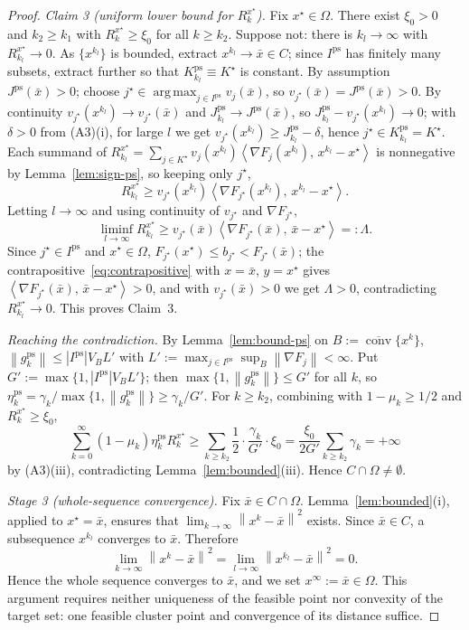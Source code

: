 \documentclass[]{interact}
\theoremstyle{plain}
\theoremstyle{definition}
\theoremstyle{remark}
\newcommand{\norm}[1]{\left\lVert #1 \right\rVert}
\newcommand{\abs}[1]{\left\lvert #1 \right\rvert}
\newcommand{\inner}[2]{\left\langle #1,\, #2 \right\rangle}
\DeclareMathOperator*{\argmax}{arg\,max}
\DeclareMathOperator{\conv}{conv}
\newcommand{\ps}{\mathrm{ps}}
\begin{document}
\begin{proof}
\smallskip
\emph{Claim 3 (uniform lower bound for $R^{x^\star}_k$).} Fix $x^\star\in\Omega$. There
exist $\xi_0>0$ and $k_2\ge k_1$ with $R^{x^\star}_k\ge\xi_0$ for all $k\ge k_2$. Suppose
not: there is $k_l\to\infty$ with $R^{x^\star}_{k_l}\to0$. As $\{x^{k_l}\}$ is bounded,
extract $x^{k_l}\to\bar x\in C$; since $I^{\ps}$ has finitely many subsets, extract
further so that $K^{\ps}_{k_l}\equiv K^\star$ is constant. By assumption
$J^{\ps}(\bar x)>0$; choose $j^\star\in\argmax_{j\in I^{\ps}}v_j(\bar x)$, so
$v_{j^\star}(\bar x)=J^{\ps}(\bar x)>0$. By continuity $v_{j^\star}(x^{k_l})\to
v_{j^\star}(\bar x)$ and $J^{\ps}_{k_l}\to J^{\ps}(\bar x)$, so
$J^{\ps}_{k_l}-v_{j^\star}(x^{k_l})\to0$; with $\delta>0$ from (A3)(i), for large $l$ we
get $v_{j^\star}(x^{k_l})\ge J^{\ps}_{k_l}-\delta$, hence $j^\star\in K^{\ps}_{k_l}=K^\star$.
Each summand of
$R^{x^\star}_{k_l}=\sum_{j\in K^\star}v_j(x^{k_l})\inner{\nabla F_j(x^{k_l})}{x^{k_l}-x^\star}$
is nonnegative by Lemma~\ref{lem:sign-ps}, so keeping only $j^\star$,
\[
R^{x^\star}_{k_l}\ge v_{j^\star}(x^{k_l})\inner{\nabla F_{j^\star}(x^{k_l})}{x^{k_l}-x^\star}.
\]
Letting $l\to\infty$ and using continuity of $v_{j^\star}$ and $\nabla F_{j^\star}$,
\[
\liminf_{l\to\infty}R^{x^\star}_{k_l}\ge v_{j^\star}(\bar x)\inner{\nabla F_{j^\star}(\bar x)}{\bar x-x^\star}=:\Lambda .
\]
Since $j^\star\in I^{\ps}$ and $x^\star\in\Omega$, $F_{j^\star}(x^\star)\le b_{j^\star}<F_{j^\star}(\bar x)$;
the contrapositive~\eqref{eq:contrapositive} with $x=\bar x$, $y=x^\star$ gives
$\inner{\nabla F_{j^\star}(\bar x)}{\bar x-x^\star}>0$, and with $v_{j^\star}(\bar x)>0$ we
get $\Lambda>0$, contradicting $R^{x^\star}_{k_l}\to0$. This proves Claim~3.

\smallskip
\emph{Reaching the contradiction.} By Lemma~\ref{lem:bound-ps} on
$B:=\overline{\conv}\{x^k\}$, $\norm{g^{\ps}_k}\le\abs{I^{\ps}}V_B L'$ with
$L':=\max_{j\in I^{\ps}}\sup_B\norm{\nabla F_j}<\infty$. Put
$G':=\max\{1,\abs{I^{\ps}}V_B L'\}$; then $\max\{1,\norm{g^{\ps}_k}\}\le G'$ for all $k$,
so $\eta^{\ps}_k=\gamma_k/\max\{1,\norm{g^{\ps}_k}\}\ge\gamma_k/G'$. For $k\ge k_2$,
combining with $1-\mu_k\ge1/2$ and $R^{x^\star}_k\ge\xi_0$,
\[
\sum_{k=0}^\infty(1-\mu_k)\eta^{\ps}_k R^{x^\star}_k\ge\sum_{k\ge k_2}\frac12\cdot\frac{\gamma_k}{G'}\cdot\xi_0=\frac{\xi_0}{2G'}\sum_{k\ge k_2}\gamma_k=+\infty
\]
by (A3)(iii), contradicting Lemma~\ref{lem:bounded}(iii). Hence $C\cap\Omega\ne\emptyset$.

\emph{Stage 3 (whole-sequence convergence).} Fix $\bar x\in C\cap\Omega$.
Lemma~\ref{lem:bounded}(i), applied to $x^\star=\bar x$, ensures that
$\lim_{k\to\infty}\norm{x^k-\bar x}^2$ exists. Since $\bar x\in C$, a subsequence
$x^{k_l}$ converges to $\bar x$. Therefore
\[
\lim_{k\to\infty}\norm{x^k-\bar x}^2
=\lim_{l\to\infty}\norm{x^{k_l}-\bar x}^2=0.
\]
Hence the whole sequence converges to $\bar x$, and we set $x^\infty:=\bar x\in\Omega$.
This argument requires neither uniqueness of the feasible point nor convexity of the
target set: one feasible cluster point and convergence of its distance suffice.
\end{proof}
\end{document}

